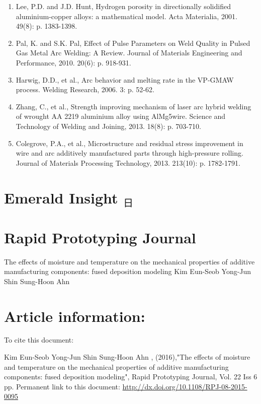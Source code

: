 \documentclass[10pt]{article}
\begin{document}
\begin{enumerate}
  \item Lee, P.D. and J.D. Hunt, Hydrogen porosity in directionally solidified aluminium-copper alloys: a mathematical model. Acta Materialia, 2001. 49(8): p. 1383-1398.

  \item Pal, K. and S.K. Pal, Effect of Pulse Parameters on Weld Quality in Pulsed Gas Metal Arc Welding: A Review. Journal of Materials Engineering and Performance, 2010. 20(6): p. 918-931.

  \item Harwig, D.D., et al., Arc behavior and melting rate in the VP-GMAW process. Welding Research, 2006. 3: p. 52-62.

  \item Zhang, C., et al., Strength improving mechanism of laser arc hybrid welding of wrought AA 2219 aluminium alloy using AlMg5wire. Science and Technology of Welding and Joining, 2013. 18(8): p. 703-710.

  \item Colegrove, P.A., et al., Microstructure and residual stress improvement in wire and arc additively manufactured parts through high-pressure rolling. Journal of Materials Processing Technology, 2013. 213(10): p. 1782-1791.

\end{enumerate}

\section*{Emerald Insight ${ }_{\text {日 }}$}
\section*{Rapid Prototyping Journal}
The effects of moisture and temperature on the mechanical properties of additive manufacturing components: fused deposition modeling Kim Eun-Seob Yong-Jun Shin Sung-Hoon Ahn

\section*{Article information:}
To cite this document:

Kim Eun-Seob Yong-Jun Shin Sung-Hoon Ahn , (2016),"The effects of moisture and temperature on the mechanical properties of additive manufacturing components: fused deposition modeling", Rapid Prototyping Journal, Vol. 22 Iss 6 pp. Permanent link to this document: \href{http://dx.doi.org/10.1108/RPJ-08-2015-0095}{http://dx.doi.org/10.1108/RPJ-08-2015-0095}
\end{document}
